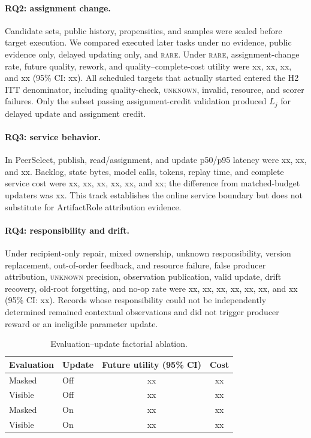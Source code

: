 \documentclass[sigconf,anonymous]{aamas}
\newcommand{\rare}{\textsc{rare}}
\newcommand{\unknown}{\textsc{unknown}}
\begin{document}
\paragraph{RQ2: assignment change.} Candidate sets, public history, propensities, and samples were sealed before target execution. We compared executed later tasks under no evidence, public evidence only, delayed updating only, and \rare{}. Under \rare{}, assignment-change rate, future quality, rework, and quality--complete-cost utility were xx, xx, xx, and xx (95\% CI: xx). All scheduled targets that actually started entered the H2 ITT denominator, including quality-check, \unknown{}, invalid, resource, and scorer failures. Only the subset passing assignment-credit validation produced $L_j$ for delayed update and assignment credit.

\paragraph{RQ3: service behavior.} In PeerSelect, publish, read/assignment, and update p50/p95 latency were xx, xx, and xx. Backlog, state bytes, model calls, tokens, replay time, and complete service cost were xx, xx, xx, xx, xx, and xx; the difference from matched-budget updaters was xx. This track establishes the online service boundary but does not substitute for ArtifactRole attribution evidence.

\paragraph{RQ4: responsibility and drift.} Under recipient-only repair, mixed ownership, unknown responsibility, version replacement, out-of-order feedback, and resource failure, false producer attribution, \unknown{} precision, observation publication, valid update, drift recovery, old-root forgetting, and no-op rate were xx, xx, xx, xx, xx, xx, and xx (95\% CI: xx). Records whose responsibility could not be independently determined remained contextual observations and did not trigger producer reward or an ineligible parameter update.

\begin{table}[t]
\centering\small
\setlength{\tabcolsep}{3pt}
\begin{tabular}{llcc}
\toprule
Evaluation & Update & Future utility (95\% CI) & Cost \\
\midrule
Masked & Off & xx & xx \\
Visible & Off & xx & xx \\
Masked & On & xx & xx \\
Visible & On & xx & xx \\
\bottomrule
\end{tabular}
\caption{Evaluation--update factorial ablation.}
\label{tab:factorial-results}
\end{table}
\end{document}
